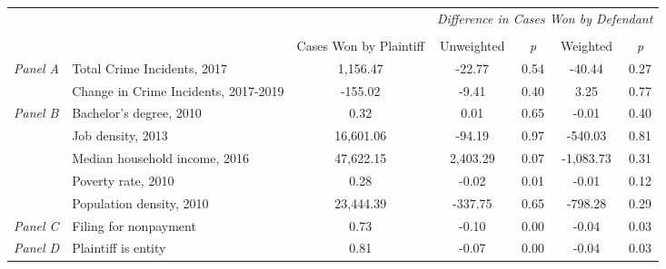 \begin{tabular}{llccccc}
\toprule
 &  & \textit{} & \multicolumn{4}{c}{\textit{Difference in Cases Won by Defendant}} \\
\cline{4-7}
\\
 &  & Cases Won by Plaintiff & Unweighted & \emph{p} & Weighted & \emph{p} \\
\midrule
\multirow[c]{2}{.75cm}{\textit{Panel A}} & Total Crime Incidents, 2017 & 1,156.47 & -22.77 & 0.54 & -40.44 & 0.27 \\
 & Change in Crime Incidents, 2017-2019 & -155.02 & -9.41 & 0.40 & 3.25 & 0.77 \\
\cline{1-7}
\multirow[c]{5}{.75cm}{\textit{Panel B}} & Bachelor's degree, 2010 & 0.32 & 0.01 & 0.65 & -0.01 & 0.40 \\
 & Job density, 2013 & 16,601.06 & -94.19 & 0.97 & -540.03 & 0.81 \\
 & Median household income, 2016 & 47,622.15 & 2,403.29 & 0.07 & -1,083.73 & 0.31 \\
 & Poverty rate, 2010 & 0.28 & -0.02 & 0.01 & -0.01 & 0.12 \\
 & Population density, 2010 & 23,444.39 & -337.75 & 0.65 & -798.28 & 0.29 \\
\cline{1-7}
\textit{Panel C} & Filing for nonpayment & 0.73 & -0.10 & 0.00 & -0.04 & 0.03 \\
\cline{1-7}
\textit{Panel D} & Plaintiff is entity & 0.81 & -0.07 & 0.00 & -0.04 & 0.03 \\
\cline{1-7}
\bottomrule
\end{tabular}
